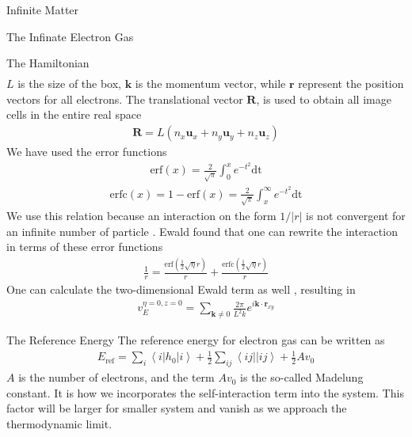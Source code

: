 \documentclass[twoside,english]{uiofysmaster}
\begin{document}
\begin{chapter}{Infinite Matter}
\begin{section}{The Infinate Electron Gas}
\begin{subsection}{The Hamiltonian}
\begin{align}
			\end{align}
			$L$ is the size of the box, $\mathbf{k}$ is the momentum vector, while $\mathbf{r}$ represent the position vectors for all electrons. The translational vector $\mathbf{R}$, is used to obtain all image cells in the entire real space \cite{MHJonline}
			\begin{align}
				\mathbf{R} = L(n_x \mathbf{u}_x + n_y \mathbf{u}_y + n_z \mathbf{u}_z)
			\end{align}
			We have used the error functions
			\begin{align}
				\text{erf}(x) = \frac{2}{\sqrt{\pi}} \int_0^x e^{-t^2} \text{dt}
			\end{align}
			\begin{align}
				\text{erfc}(x) = 1 - \text{erf}(x) = \frac{2}{\sqrt{\pi}} \int_x^\infty e^{-t^2} \text{dt}
			\end{align}
			We use this relation because an interaction on the form $1/|r|$ is not convergent for an infinite number of particle \cite{Audun}. Ewald found that one can rewrite the interaction in terms of these error functions \cite{Ewald}
			\begin{align}
				\frac{1}{r} = \frac{\text{erf}(\frac{1}{2}\sqrt{\eta}r)}{r} + \frac{\text{erfc}(\frac{1}{2}\sqrt{\eta}r)}{r}
			\end{align}
			One can calculate the two-dimensional Ewald term as well \cite{Baardsen}, resulting in 
			\begin{align}
				v_E^{\eta=0, z=0} = \sum_{\mathbf{k} \neq 0} \frac{2 \pi}{L^2 k} e^{i \mathbf{k} \cdot \mathbf{r}_{xy}}
			\end{align}
		\end{subsection}
		
		\begin{subsection}{The Reference Energy}
			The reference energy for electron gas can be written as \cite{Baardsen}
			\begin{align}
				E_{\text{ref}} = \sum_i \left<i | h_0 | i\right> + \frac{1}{2} \sum_{ij} \left<ij||ij\right> + \frac{1}{2} Av_0
			\end{align}
			$A$ is the number of electrons, and the term $A v_0$ is the so-called Madelung constant. It is how we incorporates the self-interaction term into the system. This factor will be larger for smaller system and vanish as we approach the thermodynamic limit. 
		\end{subsection}
		

\end{section}
\end{chapter}
\end{document}
